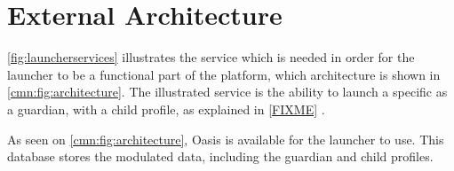 \section{External Architecture}

\autoref{fig:launcherservices} illustrates the service which is needed in order for the launcher to be a functional part of the \giraf[] platform, which architecture is shown in \autoref{cmn:fig:architecture}.
The illustrated service is the ability to launch a specific \girafapp[] as a guardian, with a child profile, as explained in \autoref{FIXME} .

As seen on \autoref{cmn:fig:architecture}, Oasis is available for the launcher to use. This database stores the modulated data, including the guardian and child profiles.


